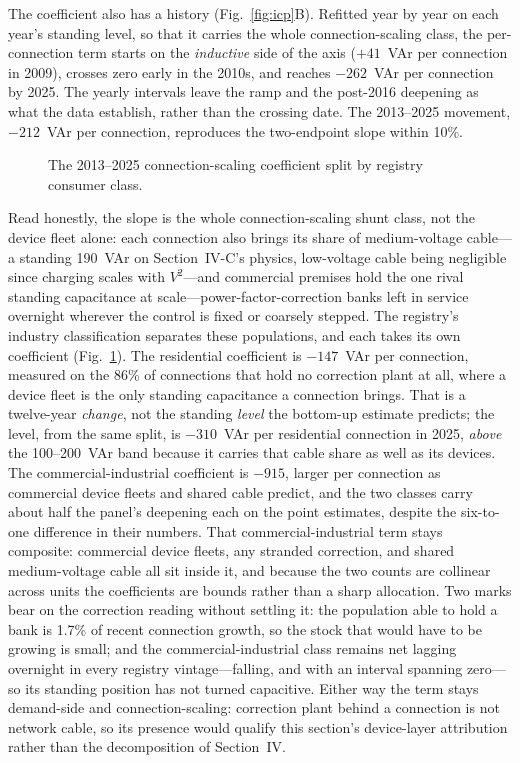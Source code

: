 \documentclass[journal]{IEEEtran}
\begin{document}
The coefficient also has a history (Fig.~\ref{fig:icp}B). Refitted year by year
on each year's standing level, so that it carries the whole connection-scaling
class, the per-connection term starts on the \emph{inductive} side of the axis
($+41$~VAr per connection in 2009), crosses zero early in the 2010s, and reaches
$-262$~VAr per connection by 2025. The yearly intervals leave the ramp and the post-2016 deepening as what the data establish, rather than the crossing date. The 2013--2025 movement, $-212$~VAr per connection, reproduces the two-endpoint slope within 10\%.


\begin{figure}[!t]
\centering

\caption{The 2013--2025 connection-scaling coefficient split by registry
consumer class.}
\label{fig:classsplit}
\end{figure}

Read honestly, the slope is the whole connection-scaling shunt class, not
the device fleet alone: each connection also brings its share of medium-voltage
cable---a standing 190~VAr on Section~IV-C's physics, low-voltage cable being
negligible since charging scales with $V^2$---and commercial premises hold the
one rival standing capacitance at
scale---power-factor-correction banks left in service overnight wherever the
control is fixed or coarsely stepped. The registry's industry classification
separates these populations, and each takes its own coefficient
(Fig.~\ref{fig:classsplit}). The residential coefficient is
$-147$~VAr per connection, measured on the 86\% of connections that hold no
correction plant at all, where a device fleet is the only standing capacitance a
connection brings. That is a twelve-year \emph{change}, not the standing
\emph{level} the bottom-up estimate predicts; the level, from the same split, is
$-310$~VAr per residential connection in 2025, \emph{above} the 100--200~VAr band
because it carries that cable share as well as its devices. The commercial-industrial coefficient is $-915$, larger per
connection as commercial device fleets and shared cable predict, and the two
classes carry about half the panel's deepening each on the point estimates, despite the six-to-one
difference in their numbers. That commercial-industrial term stays composite: commercial device fleets, any stranded correction, and
shared medium-voltage cable all sit inside it, and because the two counts are
collinear across units the coefficients are bounds rather than a sharp
allocation. Two marks bear on the correction reading without settling it: the
population able to hold a bank is 1.7\% of recent connection growth, so the stock
that would have to be growing is small; and the commercial-industrial class remains net lagging overnight in every registry vintage---falling, and with an interval spanning zero---so its standing position has not turned capacitive. Either way the term stays demand-side and
connection-scaling: correction plant behind a connection is not network
cable, so its presence would qualify this section's device-layer attribution
rather than the decomposition of Section~IV.
\end{document}
